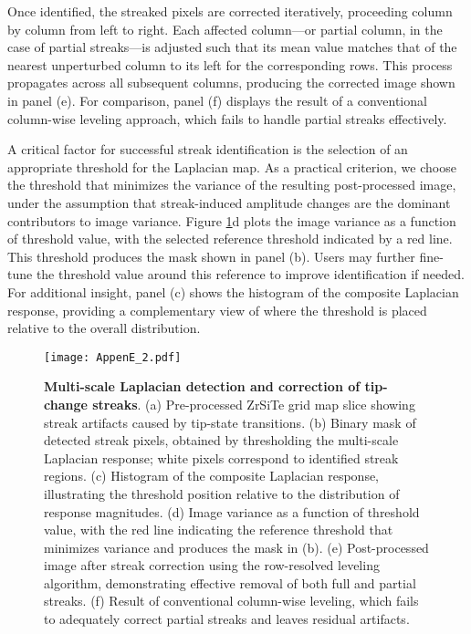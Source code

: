 Once identified, the streaked pixels are corrected iteratively, proceeding column by column from left to right. Each affected column—or partial column, in the case of partial streaks—is adjusted such that its mean value matches that of the nearest unperturbed column to its left for the corresponding rows. This process propagates across all subsequent columns, producing the corrected image shown in panel (e). For comparison, panel (f) displays the result of a conventional column-wise leveling approach, which fails to handle partial streaks effectively.

A critical factor for successful streak identification is the selection of an appropriate threshold for the Laplacian map. As a practical criterion, we choose the threshold that minimizes the variance of the resulting post-processed image, under the assumption that streak-induced amplitude changes are the dominant contributors to image variance. Figure \ref{fig:streak_2}d plots the image variance as a function of threshold value, with the selected reference threshold indicated by a red line. This threshold produces the mask shown in panel (b). Users may further fine-tune the threshold value around this reference to improve identification if needed. For additional insight, panel (c) shows the histogram of the composite Laplacian response, providing a complementary view of where the threshold is placed relative to the overall distribution.  

\begin{figure}
	\texttt{[image: AppenE\_2.pdf]}
	\centering
	\caption[\textbf{Multi-scale Laplacian detection and correction of tip-change streaks}]{\textbf{Multi-scale Laplacian detection and correction of tip-change streaks}. 
		(a) Pre-processed ZrSiTe grid map slice showing streak artifacts caused by tip-state transitions. 
		(b) Binary mask of detected streak pixels, obtained by thresholding the multi-scale Laplacian response; white pixels correspond to identified streak regions. 
		(c) Histogram of the composite Laplacian response, illustrating the threshold position relative to the distribution of response magnitudes. 
		(d) Image variance as a function of threshold value, with the red line indicating the reference threshold that minimizes variance and produces the mask in (b). 
		(e) Post-processed image after streak correction using the row-resolved leveling algorithm, demonstrating effective removal of both full and partial streaks. 
		(f) Result of conventional column-wise leveling, which fails to adequately correct partial streaks and leaves residual artifacts.}
	\label{fig:streak_2}
\end{figure}  